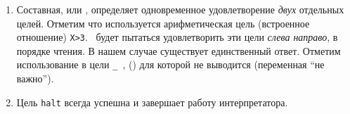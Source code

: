 \begin{enumerate}
  \item
Составная, или , определяет
одновременное удовлетворение \emph{двух} отдельных целей. Отметим что
используется арифметическая цель (встроенное отношение) \verb|X>3|.
\prolog\ будет пытаться удовлетворить эти цели \emph{слева направо}, в порядке
чтения. В нашем случае существует единственный ответ. Отметим использование
в цели  \verb|_|\ ,
 () для которой не выводится (переменная ``не важно'').

  \item 
Цель \verb|halt| всегда успешна и завершает работу интерпретатора.
\end{enumerate}